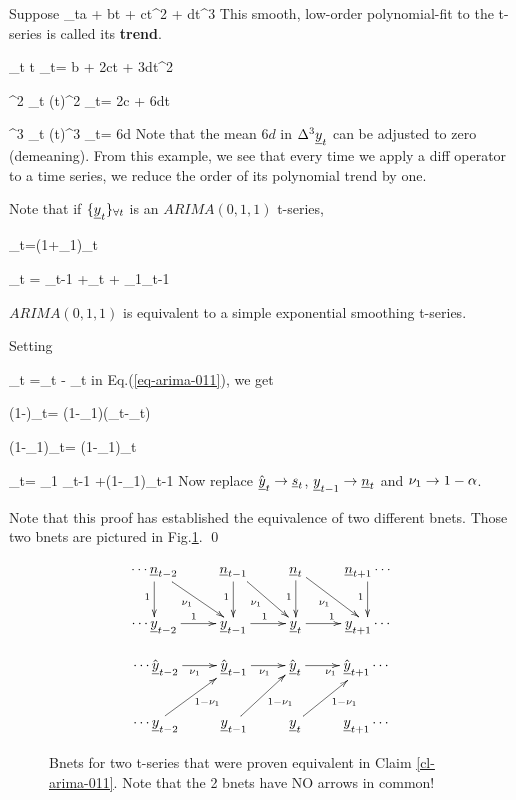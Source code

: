 Suppose 
\beq
\rvy_t\approx a + bt + ct^2 + dt^3
\eeq
This smooth, low-order polynomial-fit
 to the t-series is called its {\bf trend}.

\beq
\Delta \rvy_t \approx
\Delta t \;\; \rvy_t=
b + 2ct + 3dt^2
\eeq

\beq
\Delta^2 \rvy_t \approx
(\Delta t)^2\;\; \rvy_t=
2c + 6dt
\eeq

\beq
\Delta^3 \rvy_t \approx
(\Delta t)^3\;\; \rvy_t=
6d
\eeq
Note that the mean $6d$ 
in $\Delta^3{\underline{y}}_t$ 
can be adjusted to zero
(demeaning).
From this example,
we  see that every time
we apply a diff operator
to a time series,
we reduce 
the order 
of its polynomial trend by one.

Note that if
${\{{\underline{y}}_t\}_{\forall t}}$
is an 
$ARIMA(0,1,1)$ t-series,

\beq
\Delta\rvy_t=(1+\nu_1\calb)\rvn_t
\label{eq-arima-011}
\eeq

\beq
\rvy_t = \rvy_{t-1} +\rvn_t + \nu_1\rvn_{t-1}
\eeq

\begin{claim}\label{cl-arima-011}
$ARIMA(0,1,1)$ is equivalent to a 
simple exponential smoothing t-series.
\end{claim}
\proof
Setting

\beq
\rvn_{t} =\rvy_{t}
 - \hat{\rvy}_{t}
\eeq
in Eq.(\ref{eq-arima-011}), we get


\beq
(1-\calb)\rvy_t=
(1-\nu_1\calb)(\rvy_t-\hat{\rvy}_t)
\eeq

\beq
(1-\nu_1\calb)\hat{\rvy}_t=
(1-\nu_1)\calb\rvy_t
\eeq

\beq
\hat{\rvy}_t=
\nu_1 \hat{\rvy}_{t-1}
+(1-\nu_1)\rvy_{t-1}
\eeq
Now replace $\hat{{\underline{y}}}_t\rightarrow {\underline{s}}_t$,
${\underline{y}}_{t-1}\rightarrow {\underline{n}}_t$ and $\nu_1\rightarrow 1-\alpha$.

Note that this proof
has established
the equivalence of two different
bnets.
Those two bnets are 
pictured in Fig.\ref{fig-arima-011}.
\qed


\begin{figure}[h!]
$$
\begin{array}{c}
\xymatrix{
\cdots
\rvn_{t-2}\ar[d]_1\ar[dr]_{\nu_1}
&\rvn_{t-1}\ar[d]_1\ar[dr]_{\nu_1}
&\rvn_t\ar[d]_1\ar[dr]_{\nu_1}
&\rvn_{t+1}\ar[d]_1
\cdots
\\
\cdots
\rvy_{t-2}\ar[r]^1
&\rvy_{t-1}\ar[r]^1
&\rvy_t\ar[r]^1
&\rvy_{t+1}
\cdots
}
\\
\\
\xymatrix{
\cdots
\hat{\rvy}_{t-2}\ar[r]_{\nu_1}
&\hat{\rvy}_{t-1}\ar[r]_{\nu_1}
&\hat{\rvy}_t\ar[r]_{\nu_1}
&\hat{\rvy}_{t+1}
\cdots
\\
\cdots
\rvy_{t-2}\ar[ur]_{1-\nu_1}
&\rvy_{t-1}\ar[ur]_{1-\nu_1}
&\rvy_t\ar[ur]_{1-\nu_1}
&\rvy_{t+1}
\cdots
}
\end{array}
$$
\caption{Bnets
for two t-series that were
proven equivalent
in Claim \ref{cl-arima-011}.
Note that the 2 bnets have NO 
arrows in common!}
\label{fig-arima-011}
\end{figure}


